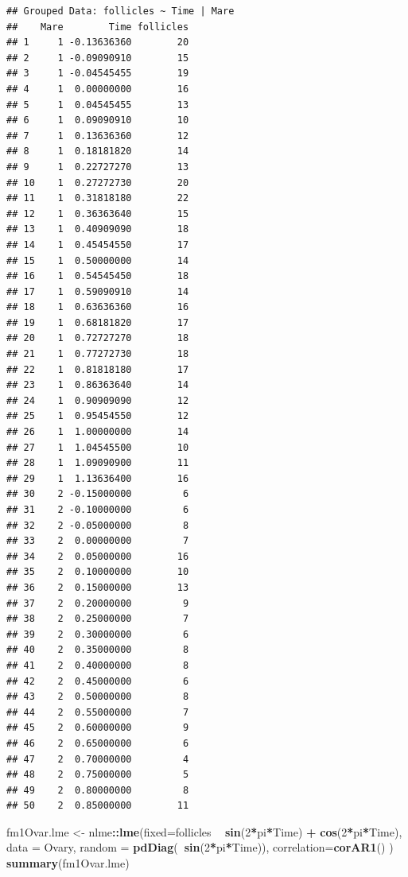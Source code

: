 \documentclass[]{book}
\newenvironment{Shaded}{\begin{snugshade}}{\end{snugshade}}
\newcommand{\KeywordTok}[1]{\textcolor[rgb]{0.13,0.29,0.53}{\textbf{#1}}}
\newcommand{\DataTypeTok}[1]{\textcolor[rgb]{0.13,0.29,0.53}{#1}}
\newcommand{\DecValTok}[1]{\textcolor[rgb]{0.00,0.00,0.81}{#1}}
\newcommand{\StringTok}[1]{\textcolor[rgb]{0.31,0.60,0.02}{#1}}
\newcommand{\OperatorTok}[1]{\textcolor[rgb]{0.81,0.36,0.00}{\textbf{#1}}}
\newcommand{\NormalTok}[1]{#1}
\begin{document}
\begin{verbatim}
## Grouped Data: follicles ~ Time | Mare
##    Mare        Time follicles
## 1     1 -0.13636360        20
## 2     1 -0.09090910        15
## 3     1 -0.04545455        19
## 4     1  0.00000000        16
## 5     1  0.04545455        13
## 6     1  0.09090910        10
## 7     1  0.13636360        12
## 8     1  0.18181820        14
## 9     1  0.22727270        13
## 10    1  0.27272730        20
## 11    1  0.31818180        22
## 12    1  0.36363640        15
## 13    1  0.40909090        18
## 14    1  0.45454550        17
## 15    1  0.50000000        14
## 16    1  0.54545450        18
## 17    1  0.59090910        14
## 18    1  0.63636360        16
## 19    1  0.68181820        17
## 20    1  0.72727270        18
## 21    1  0.77272730        18
## 22    1  0.81818180        17
## 23    1  0.86363640        14
## 24    1  0.90909090        12
## 25    1  0.95454550        12
## 26    1  1.00000000        14
## 27    1  1.04545500        10
## 28    1  1.09090900        11
## 29    1  1.13636400        16
## 30    2 -0.15000000         6
## 31    2 -0.10000000         6
## 32    2 -0.05000000         8
## 33    2  0.00000000         7
## 34    2  0.05000000        16
## 35    2  0.10000000        10
## 36    2  0.15000000        13
## 37    2  0.20000000         9
## 38    2  0.25000000         7
## 39    2  0.30000000         6
## 40    2  0.35000000         8
## 41    2  0.40000000         8
## 42    2  0.45000000         6
## 43    2  0.50000000         8
## 44    2  0.55000000         7
## 45    2  0.60000000         9
## 46    2  0.65000000         6
## 47    2  0.70000000         4
## 48    2  0.75000000         5
## 49    2  0.80000000         8
## 50    2  0.85000000        11
\end{verbatim}

\begin{Shaded}
\begin{Highlighting}[]
\NormalTok{fm1Ovar.lme <-}\StringTok{ }\NormalTok{nlme}\OperatorTok{::}\KeywordTok{lme}\NormalTok{(}\DataTypeTok{fixed=}\NormalTok{follicles }\OperatorTok{~}\StringTok{ }\KeywordTok{sin}\NormalTok{(}\DecValTok{2}\OperatorTok{*}\NormalTok{pi}\OperatorTok{*}\NormalTok{Time) }\OperatorTok{+}\StringTok{ }\KeywordTok{cos}\NormalTok{(}\DecValTok{2}\OperatorTok{*}\NormalTok{pi}\OperatorTok{*}\NormalTok{Time), }
                   \DataTypeTok{data =}\NormalTok{ Ovary, }
                   \DataTypeTok{random =} \KeywordTok{pdDiag}\NormalTok{(}\OperatorTok{~}\KeywordTok{sin}\NormalTok{(}\DecValTok{2}\OperatorTok{*}\NormalTok{pi}\OperatorTok{*}\NormalTok{Time)), }
                   \DataTypeTok{correlation=}\KeywordTok{corAR1}\NormalTok{() )}
\KeywordTok{summary}\NormalTok{(fm1Ovar.lme)}
\end{Highlighting}
\end{Shaded}
\end{document}
